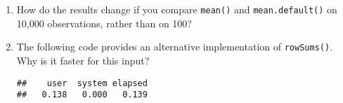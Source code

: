 \begin{enumerate}
\def\labelenumi{\arabic{enumi}.}
\item
  How do the results change if you compare \texttt{mean()} and
  \texttt{mean.default()} on 10,000 observations, rather than on 100?
\item
  The following code provides an alternative implementation of
  \texttt{rowSums()}. Why is it faster for this input?

\begin{Shaded}
\begin{Highlighting}[]
\StringTok{ }
\StringTok{ }
  \NormalTok{ (}\OperatorTok{==}\StringTok{ }\NormalTok{) }

   \OperatorTok{:}
\StringTok{ }\OperatorTok{+}\StringTok{ }
\NormalTok{  \}}
\NormalTok{\}}

\StringTok{ }\NormalTok{(}
  \NormalTok{(}\NormalTok{, }\NormalTok{(}\NormalTok{, }\NormalTok{, } \NormalTok{))}
\NormalTok{)}
\NormalTok{(}
\end{Highlighting}
\end{Shaded}

\begin{verbatim}
##    user  system elapsed 
##   0.138   0.000   0.139
\end{verbatim}

\begin{Shaded}
\begin{Highlighting}[]
\NormalTok{(}
\end{Highlighting}
\end{Shaded}


\end{enumerate}
